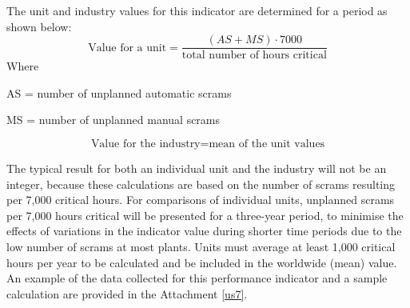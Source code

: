 The unit and industry values for this indicator are determined for a period as shown below:
$$ \text{Value for a unit} = \frac{(AS+MS) \cdot 7000}{\text{total number of hours critical}} $$
Where   

AS = number of unplanned automatic scrams 

MS = number of unplanned manual scrams

$$ \text{Value for the industry} = \text{mean of the unit values} $$

The typical result for both an individual unit and the industry will not be an integer, because these calculations are based on the number of scrams resulting per 7,000 critical hours. For comparisons of individual units, unplanned scrams per 7,000 hours critical will be presented for a three-year period, to minimise the effects of variations in the indicator value during shorter time periods due to the low number of scrams at most plants. Units must average at least 1,000 critical hours per year to be calculated and be included in the worldwide (mean) value.
An example of the data collected for this performance indicator and a
sample calculation are provided in the Attachment \ref{us7}.

